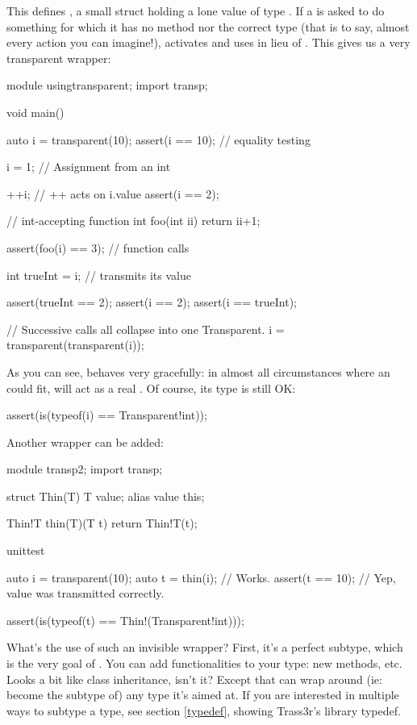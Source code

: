 This defines , a small struct holding a lone value of type . If a  is asked to do something for which it has no method nor the correct type (that is to say, almost every action you can imagine!),  activates and uses  in lieu of . This gives us a very transparent wrapper:

\begin{dcode}
module usingtransparent;
import transp;

void main()
{
    auto i = transparent(10);
    assert(i == 10); // equality testing

    i = 1; // Assignment from an int

    ++i; // ++ acts on i.value
    assert(i == 2); 

    // int-accepting function
    int foo(int ii) { return ii+1;}

    assert(foo(i) == 3); // function calls

    int trueInt = i; // transmits its value

    assert(trueInt == 2);
    assert(i == 2);
    assert(i == trueInt);

    // Successive calls all collapse into one Transparent.
    i = transparent(transparent(i));
}
\end{dcode}

As you can see,  behaves very gracefully: in almost all circumstances where an  could fit,  will act as a real . Of course, its type is still OK:

\begin{dcode}
assert(is(typeof(i) == Transparent!int));
\end{dcode}

Another wrapper can be added:

\begin{dcode}
module transp2;
import transp;

struct Thin(T)
{
    T value;
    alias value this;
}

Thin!T thin(T)(T t)
{
    return Thin!T(t);
}

unittest
{
    auto i = transparent(10);
    auto t = thin(i); // Works.
    assert(t == 10); // Yep, value was transmitted correctly.

    assert(is(typeof(t) == Thin!(Transparent!int)));
}
\end{dcode}

What's the use of such an invisible wrapper? First, it's a perfect subtype, which is the very goal of . You can add functionalities to your type: new methods, etc. Looks a bit like class inheritance, isn't it? Except that  can wrap around (ie: become the subtype of) any type it's aimed at. If you are interested in multiple ways to subtype a type, see section \ref{typedef}, showing Trass3r's library typedef.

